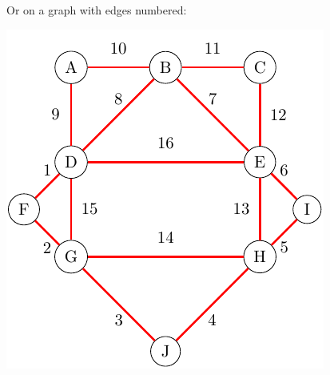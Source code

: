 \documentclass[addpoints]{exam}
\begin{document}
\begin{questions}
\begin{solution}
    Or on a graph with edges numbered:
    \begin{center}
      \includegraphics{graph2numbered}
    \end{center}
  \end{solution}
\end{questions}
\end{document}
